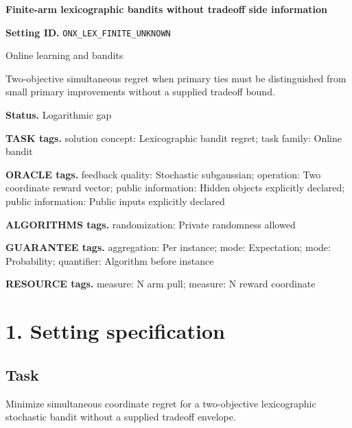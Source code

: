 \documentclass[10pt,a4paper]{article}
\begin{document}
\raggedright

{\LARGE\bfseries\sffamily\color{AtlasNavy} Finite-arm lexicographic bandits without tradeoff side information\par}\vspace{5pt}


\textbf{Setting ID.} \texttt{ONX\_\allowbreak{}LEX\_\allowbreak{}FINITE\_\allowbreak{}UNKNOWN}



Online learning and bandits



Two-objective simultaneous regret when primary ties must be distinguished from small primary improvements without a supplied tradeoff bound.



\textbf{Status.} Logarithmic gap



\textbf{TASK tags.} solution concept: Lexicographic bandit regret; task family: Online bandit



\textbf{ORACLE tags.} feedback quality: Stochastic subgaussian; operation: Two coordinate reward vector; public information: Hidden objects explicitly declared; public information: Public inputs explicitly declared



\textbf{ALGORITHMS tags.} randomization: Private randomness allowed



\textbf{GUARANTEE tags.} aggregation: Per instance; mode: Expectation; mode: Probability; quantifier: Algorithm before instance



\textbf{RESOURCE tags.} measure: N arm pull; measure: N reward coordinate



\section{1. Setting specification}


\subsection{Task}


Minimize simultaneous coordinate regret for a two-objective lexicographic stochastic bandit without a supplied tradeoff envelope.
\end{document}
